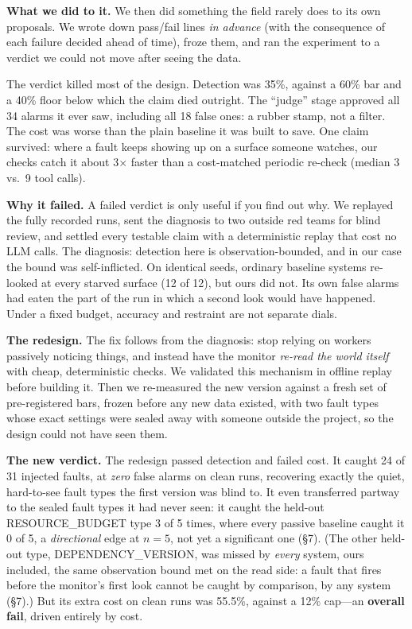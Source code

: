 \documentclass[acmsmall,screen]{acmart}
\begin{document}
\textbf{What we did to it.} We then did something the field rarely does to its
own proposals. We wrote down pass/fail lines \emph{in advance} (with the
consequence of each failure decided ahead of time), froze them, and ran the
experiment to a verdict we could not move after seeing the data.

The verdict killed most of the design. Detection was 35\%, against a 60\% bar
and a 40\% floor below which the claim died outright. The ``judge'' stage
approved all 34 alarms it ever saw, including all 18 false ones: a rubber
stamp, not a filter. The cost was worse than the plain baseline it was built to
save. One claim survived: where a fault keeps showing up on a surface someone
watches, our checks catch it about 3$\times$ faster than a cost-matched
periodic re-check (median 3 vs.\ 9 tool calls).

\textbf{Why it failed.} A failed verdict is only useful if you find out why. We
replayed the fully recorded runs, sent the diagnosis to two outside red teams
for blind review, and settled every testable claim with a deterministic replay
that cost no LLM calls. The diagnosis: detection here is observation-bounded,
and in our case the bound was self-inflicted. On identical seeds, ordinary
baseline systems re-looked at every starved surface (12 of 12), but ours did
not. Its own false alarms had eaten the part of the run in which a second look
would have happened. Under a fixed budget, accuracy and restraint are not
separate dials.

\textbf{The redesign.} The fix follows from the diagnosis: stop relying on
workers passively noticing things, and instead have the monitor \emph{re-read
the world itself} with cheap, deterministic checks. We validated this mechanism
in offline replay before building it. Then we re-measured the new version
against a fresh set of pre-registered bars, frozen before any new data existed,
with two fault types whose exact settings were sealed away with someone outside
the project, so the design could not have seen them.

\textbf{The new verdict.} The redesign passed detection and failed cost. It
caught 24 of 31 injected faults, at \emph{zero} false alarms on clean runs,
recovering exactly the quiet, hard-to-see fault types the first version was
blind to. It even transferred partway to the sealed fault types it had never
seen: it caught the held-out RESOURCE\_BUDGET type 3 of 5 times, where every
passive baseline caught it 0 of 5, a \emph{directional} edge at $n=5$, not yet a
significant one (\S7). (The other held-out type, DEPENDENCY\_VERSION, was missed
by \emph{every} system, ours included, the same observation bound met on the
read side: a fault that fires before the monitor's first look cannot be caught by
comparison, by any system (\S7).) But its extra cost on clean runs was 55.5\%,
against a 12\% cap---an \textbf{overall fail}, driven entirely by cost.
\end{document}
